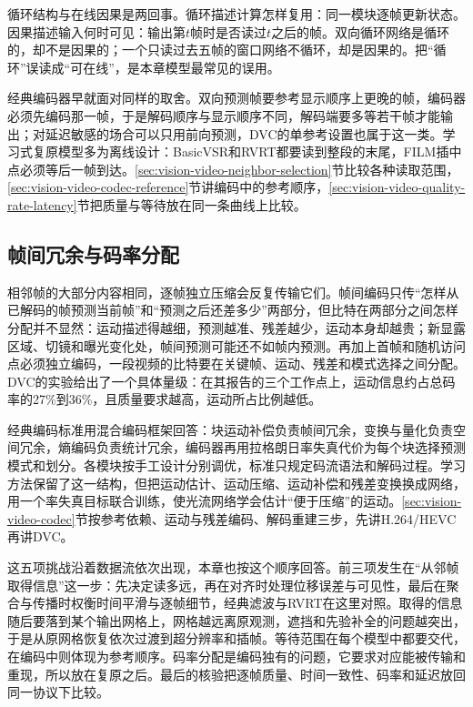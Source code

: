 循环结构与在线因果是两回事。循环描述计算怎样复用：同一模块逐帧更新状态。因果描述输入何时可见：输出第$t$帧时是否读过$t$之后的帧。双向循环网络是循环的，却不是因果的；一个只读过去五帧的窗口网络不循环，却是因果的。把“循环”误读成“可在线”，是本章模型最常见的误用。

经典编码器早就面对同样的取舍。双向预测帧要参考显示顺序上更晚的帧，编码器必须先编码那一帧，于是解码顺序与显示顺序不同，解码端要多等若干帧才能输出；对延迟敏感的场合可以只用前向预测，DVC的单参考设置也属于这一类。学习式复原模型多为离线设计：BasicVSR和RVRT都要读到整段的末尾，FILM插中点必须等后一帧到达。\ref{sec:vision-video-neighbor-selection}节比较各种读取范围，\ref{sec:vision-video-codec-reference}节讲编码中的参考顺序，\ref{sec:vision-video-quality-rate-latency}节把质量与等待放在同一条曲线上比较。

\subsection{帧间冗余与码率分配}
\label{sec:vision-video-challenge-rate}

相邻帧的大部分内容相同，逐帧独立压缩会反复传输它们。帧间编码只传“怎样从已解码的帧预测当前帧”和“预测之后还差多少”两部分，但比特在两部分之间怎样分配并不显然：运动描述得越细，预测越准、残差越少，运动本身却越贵；新显露区域、切镜和曝光变化处，帧间预测可能还不如帧内预测。再加上首帧和随机访问点必须独立编码，一段视频的比特要在关键帧、运动、残差和模式选择之间分配。DVC的实验给出了一个具体量级：在其报告的三个工作点上，运动信息约占总码率的27\%到36\%，且质量要求越高，运动所占比例越低。

经典编码标准用混合编码框架回答：块运动补偿负责帧间冗余，变换与量化负责空间冗余，熵编码负责统计冗余，编码器再用拉格朗日率失真代价为每个块选择预测模式和划分。各模块按手工设计分别调优，标准只规定码流语法和解码过程。学习方法保留了这一结构，但把运动估计、运动压缩、运动补偿和残差变换换成网络，用一个率失真目标联合训练，使光流网络学会估计“便于压缩”的运动。\ref{sec:vision-video-codec}节按参考依赖、运动与残差编码、解码重建三步，先讲H.264/HEVC再讲DVC。

这五项挑战沿着数据流依次出现，本章也按这个顺序回答。前三项发生在“从邻帧取得信息”这一步：先决定读多远，再在对齐时处理位移误差与可见性，最后在聚合与传播时权衡时间平滑与逐帧细节，经典滤波与RVRT在这里对照。取得的信息随后要落到某个输出网格上，网格越远离原观测，遮挡和先验补全的问题越突出，于是从原网格恢复依次过渡到超分辨率和插帧。等待范围在每个模型中都要交代，在编码中则体现为参考顺序。码率分配是编码独有的问题，它要求对应能被传输和重现，所以放在复原之后。最后的核验把逐帧质量、时间一致性、码率和延迟放回同一协议下比较。

